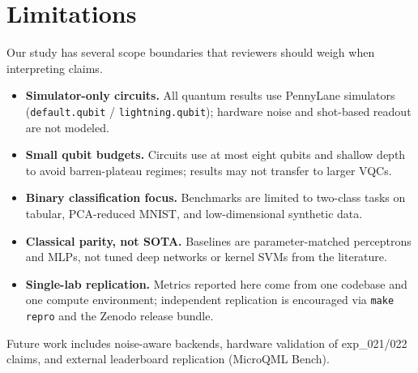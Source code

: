\section{Limitations}
\label{sec:limitations}

Our study has several scope boundaries that reviewers should weigh when interpreting claims.

\begin{itemize}
  \item \textbf{Simulator-only circuits.} All quantum results use PennyLane simulators
        (\texttt{default.qubit} / \texttt{lightning.qubit}); hardware noise and
        shot-based readout are not modeled.
  \item \textbf{Small qubit budgets.} Circuits use at most eight qubits and shallow
        depth to avoid barren-plateau regimes; results may not transfer to larger VQCs.
  \item \textbf{Binary classification focus.} Benchmarks are limited to two-class tasks
        on tabular, PCA-reduced MNIST, and low-dimensional synthetic data.
  \item \textbf{Classical parity, not SOTA.} Baselines are parameter-matched perceptrons
        and MLPs, not tuned deep networks or kernel SVMs from the literature.
  \item \textbf{Single-lab replication.} Metrics reported here come from one codebase
        and one compute environment; independent replication is encouraged via
        \texttt{make repro} and the Zenodo release bundle.
\end{itemize}

Future work includes noise-aware backends, hardware validation of exp\_021/022 claims,
and external leaderboard replication (MicroQML Bench).
